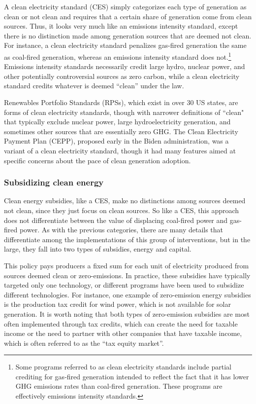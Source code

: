 \documentclass[12pt]{article}
\begin{document}
\medskip{}  A clean electricity standard (CES) simply categorizes each type of generation as clean or not clean and requires that a certain share of generation come from clean sources. Thus, it looks very much like an emissions intensity standard, except there is no distinction made among generation sources that are deemed not clean. For instance, a clean electricity standard penalizes gas-fired generation the same as coal-fired generation, whereas an emissions intensity standard does not.\footnote{Some programs referred to as clean electricity standards include partial crediting for gas-fired generation intended to reflect the fact that it has lower GHG emissions rates than coal-fired generation. These programs are effectively emissions intensity standards.} Emissions intensity standards necessarily credit large hydro, nuclear power, and other potentially controversial sources as zero carbon, while a clean electricity standard credits whatever is deemed ``clean'' under the law. 

Renewables Portfolio Standards (RPSs), which exist in over 30 US states, are forms of clean electricity standards, though with narrower definitions of ``clean" that typically exclude nuclear power, large hydroelectricity generation, and sometimes other sources that are essentially zero GHG.  The Clean Electricity Payment Plan (CEPP), proposed early in the Biden administration, was a variant of a clean electricity standard, though it had many features aimed at specific concerns about the pace of clean generation adoption.

\subsubsection{Subsidizing clean energy}  Clean energy subsidies, like a CES, make no distinctions among sources deemed not clean, since they just focus on clean sources. So like a CES, this approach does not differentiate between the value of displacing coal-fired power and gas-fired power. As with the previous categories, there are many details that differentiate among the implementations of this group of interventions, but in the large, they fall into two types of subsidies, energy and capital.

\medskip{}  This policy pays producers a fixed sum for each unit of electricity produced from sources deemed clean or zero-emissions. In practice, these subsidies have typically targeted only one technology, or different programs have been used to subsidize different technologies. For instance, one example of zero-emission energy subsidies is the production tax credit for wind power, which is not available for solar generation.  It is worth noting that both types of zero-emission subsidies are most often implemented through tax credits, which can create the need for taxable income or the need to partner with other companies that have taxable income, which is often referred to as the ``tax equity market''.
\end{document}
